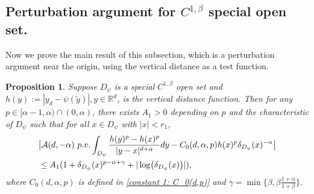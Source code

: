 \documentclass[12pt,a4paper]{amsart}
\numberwithin{equation}{section}
\theoremstyle{plain}
\newcommand{\ga}{\gamma}
\newcommand{\mc}{\mathcal}
\newcommand{\mb}{\mathbb}
\newcommand{\wt}{\widetilde}
\newcommand{\1}{\mathbbm{1}}
\newtheorem{prop}[theorem]{Proposition}
\begin{document}
\subsection{Perturbation argument for $C^{1,\beta}$ special open set.}
Now we prove the main result of this subsection, which is a perturbation argument near the origin, using the vertical distance as a test function.
\begin{prop} \label{key prop: perturbation}
Suppose $D_{\psi}$ is a special $C^{1,\beta}$ open set and $h(y) := |y_d - \psi(\wt y)|, y \in \mb R^d$, is the vertical distance function. Then for any $p\in [\alpha-1,\alpha)\cap(0,\alpha)$, 
there exists $A_1>0$ depending on $p$ and the characteristic of $D_\psi$ 
such that for all $x\in D_{\psi}$ with $|x|<r_1$, 
\begin{align}\label{key-esti}
&\big|  \mc{A}(d,-\alpha){\ \rm p.v.} \int_{D_{\psi}} \frac{h(y)^p - h(x)^p}{|y-x|^{d+\alpha}}dy - C_0(d,\alpha,p)h(x)^p \delta_{D_{\psi}}(x)^{-\alpha} \big | \\
&\le  A_1(1+ \delta_{D_{\psi}}(x)^{p-\alpha+\ga} + |\log(\delta_{D_{\psi}}(x))|),\nonumber
\end{align}
where $C_0(d,\alpha,p)$ is defined in \eqref{constant 1: C_0(d,p)} and $\ga = \min\{\beta, \beta \frac{1+\alpha}{1+\beta}\}$.
\end{prop}
\end{document}
